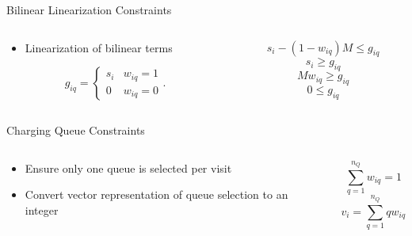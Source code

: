 \documentclass[bigger]{beamer}
\begin{document}
\begin{frame}[label={sec:orgbf6f1fd}]{Bilinear Linearization Constraints}
\begin{columns}
\begin{column}{0.5\columnwidth}
\begin{itemize}
\item Linearization of bilinear terms
\end{itemize}

\begin{equation*}
    \label{eq:giq_cases}
    g_{iq} =
    \begin{cases}
        s_i & w_{iq} = 1 \\
        0 & w_{iq} = 0
    \end{cases}.
\end{equation*}
\end{column}


\begin{column}{0.5\columnwidth}
\begin{equation*}
    s_i - (1 - w_{iq})M \leq g_{iq}
\end{equation*}
\begin{equation*}
    s_i \geq g_{iq}
\end{equation*}
\begin{equation*}
    Mw_{iq} \geq g_{iq}
\end{equation*}
\begin{equation*}
    0 \leq g_{iq}
\end{equation*}
\end{column}
\end{columns}
\end{frame}

\begin{frame}[label={sec:orgb72498c}]{Charging Queue Constraints}
\begin{columns}
\begin{column}{0.5\columnwidth}
\begin{itemize}
\item Ensure only one queue is selected per visit
\item Convert vector representation of queue selection to an integer
\end{itemize}
\end{column}

\begin{column}{0.5\columnwidth}
\begin{equation*}
    \sum_{q=1}^{n_Q} w_{iq} = 1
\end{equation*}
\begin{equation*}
    v_i = \sum_{q=1}^{n_Q} qw_{iq}
\end{equation*}
\end{column}
\end{columns}
\end{frame}
\end{document}
